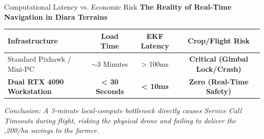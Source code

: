 \documentclass[aspectratio=169, xcolor=table]{beamer}
\begin{document}
\begin{frame}{Computational Latency vs. Economic Risk}
    \textbf{The Reality of Real-Time Navigation in Diara Terrains}
    
    \vspace{0.3cm}
    \begin{center}
    \begin{tabular}{|l|c|c|c|}
    \hline
    \rowcolor{blue!20}
    \textbf{Infrastructure} & \textbf{Load Time} & \textbf{EKF Latency} & \textbf{Crop/Flight Risk} \\
    \hline
    Standard Pixhawk / Mini-PC & $\sim$3 Minutes & > 100ms & \color{red}\textbf{Critical (Gimbal Lock/Crash)} \\
    \hline
    \textbf{Dual RTX 4090 Workstation} & \textbf{< 30 Seconds} & \textbf{< 10ms} & \color{green}\textbf{Zero (Real-Time Safety)} \\
    \hline
    \end{tabular}
    \end{center}
    
    \vspace{0.3cm}
    \textit{Conclusion: A 3-minute local-compute bottleneck directly causes Service Call Timeouts during flight, risking the physical drone and failing to deliver the ,200/ha savings to the farmer.}
\end{frame}
\end{document}
